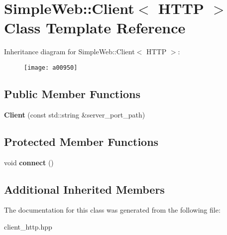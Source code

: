 \hypertarget{a00950}{}\section{Simple\+Web\+:\+:Client$<$ H\+T\+TP $>$ Class Template Reference}
\label{a00950}
Inheritance diagram for Simple\+Web\+:\+:Client$<$ H\+T\+TP $>$\+:\begin{figure}[H]
\begin{center}
\leavevmode
\texttt{[image: a00950]}
\end{center}
\end{figure}
\subsection*{Public Member Functions}
\begin{DoxyCompactItemize}
\item 
\mbox{\label{a00950_a47655afc849e459096743876391dae17}} 
{\bfseries Client} (const std\+::string \&server\+\_\+port\+\_\+path)
\end{DoxyCompactItemize}
\subsection*{Protected Member Functions}
\begin{DoxyCompactItemize}
\item 
\mbox{\label{a00950_aebed110274c94b539e2d0a857c24991d}} 
void {\bfseries connect} ()
\end{DoxyCompactItemize}
\subsection*{Additional Inherited Members}


The documentation for this class was generated from the following file\+:\begin{DoxyCompactItemize}
\item 
client\+\_\+http.\+hpp\end{DoxyCompactItemize}
